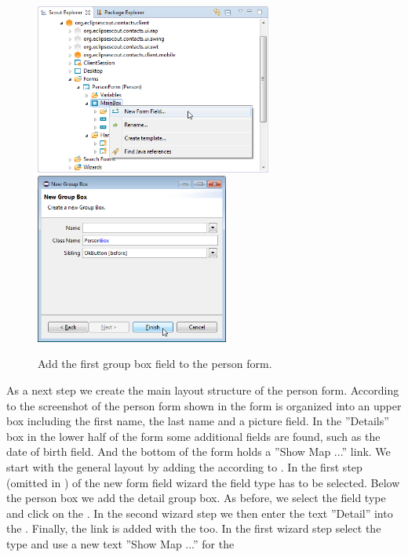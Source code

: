 \documentclass[a4paper,10pt,twoside]{book}
\begin{document}
\begin{figure}
\includegraphics[height=5.6cm]{new_field_personbox.png} \hspace{5mm}
\includegraphics[height=5.6cm]{new_field_personbox_name.png}
\caption{Add the first group box field to the person form.}
\end{figure}

As a next step we create the main layout structure of the person form. 
According to the screenshot of the person form shown in  the form is organized into an upper box including the first name, the last name and a picture field. 
In the ''Details'' box in the lower half of the form some additional fields are found, such as the date of birth field. 
And the bottom of the form holds a ''Show Map ...'' link.
We start with the general layout by adding the  according to . 
In the first step (omitted in ) of the new form field wizard the field type  has to be selected. 
Below the person box we add the detail group box. 
As before, we select the   field type and click on the . 
In the second wizard step we then enter the text ''Detail'' into the . 
Finally, the link is added with the  too. 
In the first wizard step select the type  and use a new text ''Show Map ...'' for the 
\end{document}

